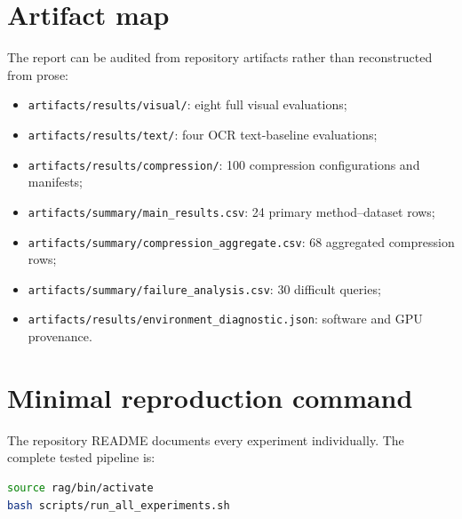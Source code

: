 \documentclass[11pt,a4paper]{article}
\newcommand{\code}[1]{\texttt{#1}}
\begin{document}
\appendix
\section{Artifact map}

The report can be audited from repository artifacts rather than reconstructed from prose:
\begin{itemize}
  \item \code{artifacts/results/visual/}: eight full visual evaluations;
  \item \code{artifacts/results/text/}: four OCR text-baseline evaluations;
  \item \code{artifacts/results/compression/}: 100 compression configurations and manifests;
  \item \code{artifacts/summary/main\_results.csv}: 24 primary method--dataset rows;
  \item \code{artifacts/summary/compression\_aggregate.csv}: 68 aggregated compression rows;
  \item \code{artifacts/summary/failure\_analysis.csv}: 30 difficult queries;
  \item \code{artifacts/results/environment\_diagnostic.json}: software and GPU provenance.
\end{itemize}

\section{Minimal reproduction command}

The repository README documents every experiment individually. The complete tested pipeline is:
\begin{lstlisting}[language=bash]
source rag/bin/activate
bash scripts/run_all_experiments.sh
\end{lstlisting}
\end{document}
